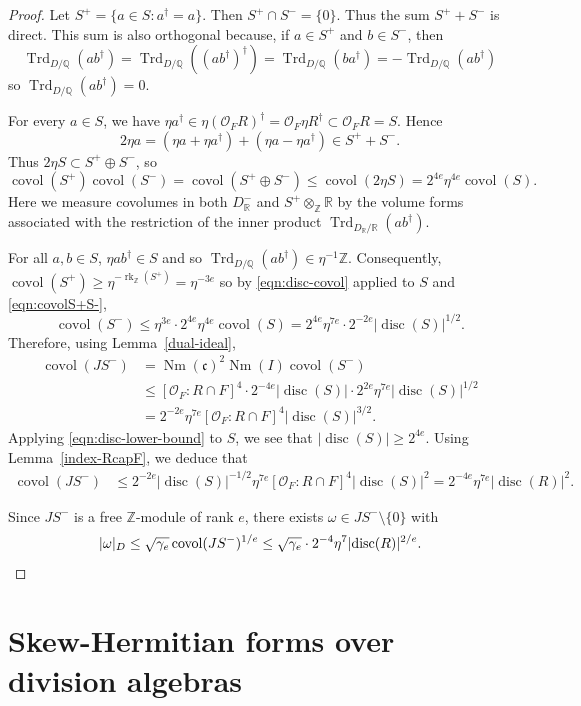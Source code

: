 \documentclass[11pt]{article}
\numberwithin{equation}{section}
\newcommand{\bQ}{\mathbb{Q}}
\newcommand{\bR}{\mathbb{R}}
\newcommand{\bZ}{\mathbb{Z}}
\newcommand{\cO}{\mathcal{O}}
\newcommand{\fc}{\mathfrak{c}}
\DeclareMathOperator{\covol}{covol}
\DeclareMathOperator{\disc}{disc}
\DeclareMathOperator{\Nm}{Nm}
\DeclareMathOperator{\rk}{rk}
\DeclareMathOperator{\Trd}{Trd}
\newcommand{\abs}[1]{\lvert #1 \rvert}
\begin{document}
\begin{proof}
Let $S^+ = \{ a \in S : a^\dag = a \}$.
Then $S^+ \cap S^- = \{0\}$.
Thus the sum $S^+ + S^-$ is direct. This sum is also orthogonal because, if $a \in S^+$ and $b \in S^-$, then
\[
\Trd_{D/\bQ}(ab^\dag) = \Trd_{D/\bQ}((ab^\dag)^\dag) = \Trd_{D/\bQ}(ba^\dag) = -\Trd_{D/\bQ}(ab^\dag)
\]
so $\Trd_{D/\bQ}(ab^\dag) = 0$.

For every $a \in S$, we have $\eta a^\dag \in \eta (\cO_F R)^\dag = \cO_F \eta R^\dag \subset \cO_F R = S$.
Hence
\[
2\eta a = (\eta a+\eta a^\dag) + (\eta a-\eta a^\dag) \in S^+ + S^-.
\]
Thus $2\eta S \subset S^+\oplus S^-$, so
\begin{equation} \label{eqn:covolS+S-}
\covol(S^+) \covol(S^-) = \covol(S^+ \oplus S^-) \leq \covol(2\eta S) = 2^{4e} \eta^{4e} \covol(S).
\end{equation}
Here we measure covolumes in both $D_\bR^-$ and $S^+ \otimes_{\bZ} \bR$ by the volume forms associated with the restriction of the inner product $\Trd_{D_\bR/\bR}(ab^\dag)$.

For all $a,b \in S$, $\eta ab^\dag \in S$ and so $\Trd_{D/\bQ}(ab^\dag) \in \eta^{-1}\bZ$.
Consequently, $\covol(S^+) \geq \eta^{-\rk_\bZ(S^+)} = \eta^{-3e}$ so by \eqref{eqn:disc-covol} applied to $S$ and \eqref{eqn:covolS+S-},
\[
\covol(S^-) \leq \eta^{3e} \cdot 2^{4e} \eta^{4e} \covol(S) = 2^{4e} \eta^{7e} \cdot 2^{-2e} \abs{\disc(S)}^{1/2}.
\]
Therefore, using Lemma~\ref{dual-ideal},
\begin{align*}
\covol(JS^-)
& = \Nm(\fc)^2 \Nm(I) \covol(S^-)
\\& \leq [\cO_F : R \cap F]^4 \cdot 2^{-4e} \abs{\disc(S)} \cdot 2^{2e} \eta^{7e} \abs{\disc(S)}^{1/2}
\\& = 2^{-2e} \eta^{7e} [\cO_F : R \cap F]^4 \abs{\disc(S)}^{3/2}.
\end{align*}
Applying \eqref{eqn:disc-lower-bound} to $S$, we see that $\abs{\disc(S)} \geq 2^{4e}$.
Using Lemma~\ref{index-RcapF}, we deduce that
\begin{align*}
\covol(JS^-)
& \leq 2^{-2e} \abs{\disc(S)}^{-1/2} \eta^{7e} [\cO_F : R \cap F]^4 \abs{\disc(S)}^2
= 2^{-4e} \eta^{7e} \abs{\disc(R)}^2.
\end{align*}

Since $JS^-$ is a free $\bZ$-module of rank $e$, there exists $\omega \in JS^- \setminus \{0\}$ with
\[
\abs{\omega}_D \leq \sqrt{\gamma_e} \covol(JS^-)^{1/e} \leq \sqrt{\gamma_e} \cdot 2^{-4} \eta^7 \abs{\disc(R)}^{2/e}.
\qedhere
\]
\end{proof}

\section{Skew-Hermitian forms over division algebras} \label{sec:skew-hermitian}
\end{document}
